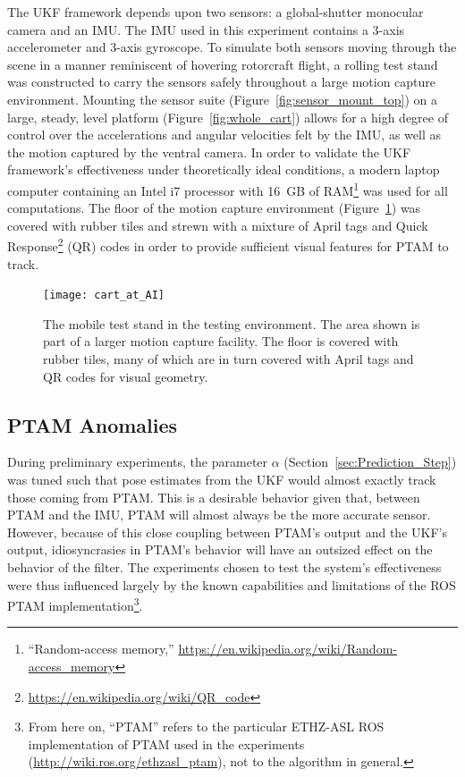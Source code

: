 The UKF framework depends upon two sensors: a global-shutter monocular camera and an IMU. The IMU used in this experiment contains a 3-axis accelerometer and 3-axis gyroscope. To simulate both sensors moving through the scene in a manner reminiscent of hovering rotorcraft flight, a rolling test stand was constructed to carry the sensors safely throughout a large motion capture environment. Mounting the sensor suite (Figure~\ref{fig:sensor_mount_top}) on a large, steady, level platform (Figure~\ref{fig:whole_cart}) allows for a high degree of control over the accelerations and angular velocities felt by the IMU, as well as the motion captured by the ventral camera. In order to validate the UKF framework's effectiveness under theoretically ideal conditions, a modern laptop computer containing an Intel i7 processor with 16~GB of RAM\footnote{``Random-access memory,'' \url{https://en.wikipedia.org/wiki/Random-access_memory}} was used for all computations. The floor of the motion capture environment (Figure~\ref{fig:cart_at_AI}) was covered with rubber tiles and strewn with a mixture of April tags and Quick Response\footnote{\url{https://en.wikipedia.org/wiki/QR_code}} (QR) codes in order to provide sufficient visual features for PTAM to track.

\begin{figure}[H]
  \centering
    \texttt{[image: cart\_at\_AI]}
  \caption[Testing Environment]{The mobile test stand in the testing environment. The area shown is part of a larger motion capture facility. The floor is covered with rubber tiles, many of which are in turn covered with April tags and QR codes for visual geometry.}
  \label{fig:cart_at_AI}
\end{figure}

\subsection{PTAM Anomalies}

During preliminary experiments, the parameter $\alpha$ (Section~\ref{sec:Prediction_Step}) was tuned such that pose estimates from the UKF would almost exactly track those coming from PTAM. This is a desirable behavior given that, between PTAM and the IMU, PTAM will almost always be the more accurate sensor. However, because of this close coupling between PTAM's output and the UKF's output, idiosyncrasies in PTAM's behavior will have an outsized effect on the behavior of the filter. The experiments chosen to test the system's effectiveness were thus influenced largely by the known capabilities and limitations of the ROS PTAM implementation\footnote{From here on, ``PTAM'' refers to the particular ETHZ-ASL ROS implementation of PTAM used in the experiments (\url{http://wiki.ros.org/ethzasl_ptam}), not to the algorithm in general.}.

